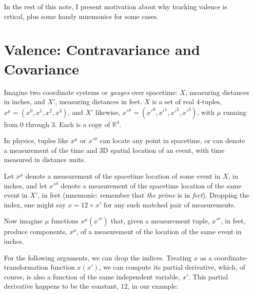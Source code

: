 \documentclass[no-fonts,nols]{tufte-handout}
\begin{document}
\noindent In the rest of this note, I present motivation about why
tracking valence is crtical, plus some handy mnemonics for some
cases.

\section{Valence: Contravariance and Covariance}

Imagine two coordinate systems or \textit{gauges} over spacetime:
$X$, measuring distances in inches, and ${X'}$, measuring distances
in feet. $X$ is a set of real 4\nobreakdash-tuples,
$x^\mu=(x^0,x^1,x^2,x^3)$, and $X'$ likewise,
${x'}^\mu=({x'}^0,{x'}^1,{x'}^2,{x'}^3)$, with $\mu$ running from $0$
through $3$. Each is a copy of $\mathbb{R}^4$.

In physics, tuples like $x^\mu$ or ${x'}^\mu$ can locate any
point in spacetime, or can denote a measurement of 
the time and 3D spatial location of an event,
with time measured in distance units.

Let $x^\mu$ denote a measurement of the spacetime location of some event in
$X$, in inches, and let ${x'}^{\mu}$ denote a measurement of the spacetime
location of the same event in $X'$, in feet (mnemonic: remember that
\textit{the prime} is in \textit{feet}). Dropping the
index, one might say $x=12 \times x'$ for any such matched pair of
measurements.

Now imagine $\mu$ functions $x^\mu({x'}^{\nu})$ that, given a
measurement tuple, ${x'}^{\nu}$, in feet, produce components,
$x^\mu$, of a measurement of the location of the same event in
inches.

For the following arguments, we can drop the
indices. Treating $x$ as a
coordinate-transformation function $x(x')$, we can compute its
partial derivative, which,
of course, is also a function of the same independent variable, $x'$.
This partial derivative happens to be the constant, $12$, in our
example:
\end{document}

